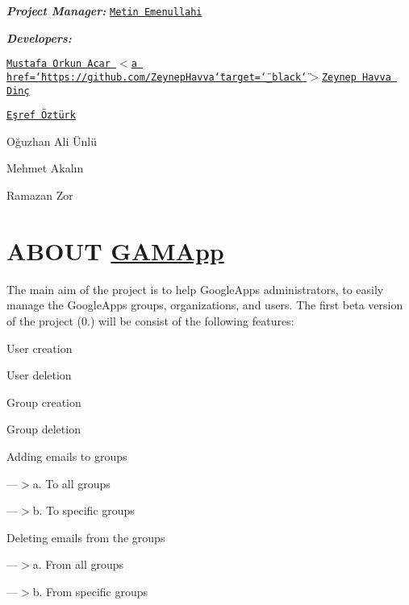 {\bfseries {\itshape Project Manager\-:}} \href{https://github.com/mtndesign}{\tt Metin Emenullahi}

{\bfseries {\itshape Developers\-:}} \par
 \href{https://github.com/mustafaorkunacar}{\tt Mustafa Orkun Acar $<$a href=\char`\"{}https\-://github.\-com/\-Zeynep\-Havva\char`\"{}target=\char`\"{}\-\_\-black\char`\"{}$>$Zeynep Havva Dinç}\par
 \href{https://github.com/esrefozturk}{\tt Eşref Öztürk}\par
 Oğuzhan Ali Ünlü\par
 Mehmet Akalın\par
 Ramazan Zor 

\section*{A\-B\-O\-U\-T \hyperlink{namespace_g_a_m_app}{G\-A\-M\-App} }

The main aim of the project is to help Google\-Apps administrators, to easily manage the Google\-Apps groups, organizations, and users. The first beta version of the project (0.) will be consist of the following features\-:\par

\begin{DoxyEnumerate}
\item User creation\par

\item User deletion\par

\item Group creation\par

\item Group deletion\par

\item Adding emails to groups\par
 ---$>$a. To all groups\par
 ---$>$b. To specific groups\par

\item Deleting emails from the groups \par
 ---$>$a. From all groups\par
 ---$>$b. From specific groups
\end{DoxyEnumerate}
